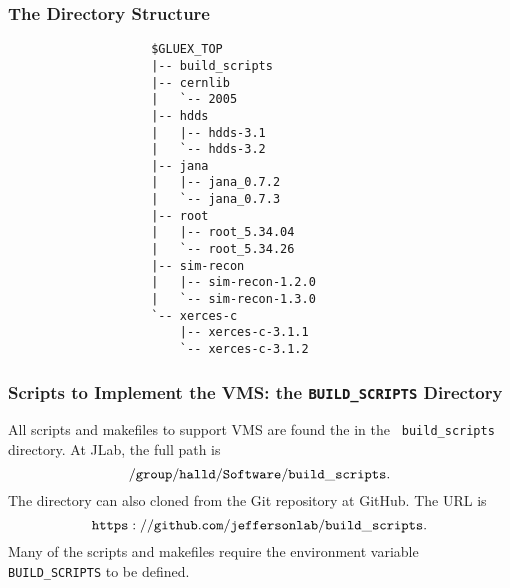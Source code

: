 \documentclass{beamer}
\begin{document}
\begin{frame}[fragile]
  \frametitle{The Directory Structure}
{\small
\begin{verbatim}
                    $GLUEX_TOP
                    |-- build_scripts
                    |-- cernlib
                    |   `-- 2005
                    |-- hdds
                    |   |-- hdds-3.1
                    |   `-- hdds-3.2
                    |-- jana
                    |   |-- jana_0.7.2
                    |   `-- jana_0.7.3
                    |-- root
                    |   |-- root_5.34.04
                    |   `-- root_5.34.26
                    |-- sim-recon
                    |   |-- sim-recon-1.2.0
                    |   `-- sim-recon-1.3.0
                    `-- xerces-c
                        |-- xerces-c-3.1.1
                        `-- xerces-c-3.1.2
\end{verbatim}
}

\end{frame}
\begin{frame}
  \frametitle{Scripts to Implement the VMS: the {\tt BUILD\_SCRIPTS} Directory}

All scripts and makefiles to support VMS are found the in the {\tt
  build\_scripts} directory. At JLab, the full path is
$${\tt /group/halld/Software/build\_scripts}.$$
The directory can also cloned from the Git repository at GitHub. The URL is
$${\tt https://github.com/jeffersonlab/build\_scripts}.$$
Many of the scripts and makefiles require the environment variable {\tt BUILD\_SCRIPTS} to be defined.

\end{frame}
\end{document}
